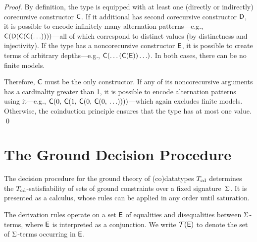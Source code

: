 \begin{report}
\begin{proof}
By definition, the type is equipped with at least one (directly or indirectly)
corecursive constructor $\textsf{C}$. If it additional has second
corecursive constructor $\textsf{D}$, it is possible to encode infinitely many
alternation patterns---e.g.,
$\textsf{C}(\textsf{D}(\textsf{C}(\textsf{C}(\ldots))))$---all of which correspond
to distinct values (by distinctness and injectivity). If the type has a
noncorecursive constructor $\textsf{E}$, it is possible to create terms of
arbitrary depths---e.g., $\textsf{C}(\ldots(\textsf{C}(\textsf{E}))\ldots)$. In
both cases, there can be no finite models.

Therefore, $\textsf{C}$ must be the only constructor.
If any of its noncorecursive arguments has a cardinality greater than 1,
it is possible to encode alternation patterns using it---e.g.,
$\textsf{C}(0,\: \textsf{C}(1,\: \textsf{C}(0,\: \textsf{C}(0,\: \ldots))))$---which
again excludes finite models. Otherwise, the coinduction principle ensures
that the type has at most one value.
\qed
\end{proof}
\end{report}


\section{The Ground Decision Procedure} %
\label{sec:a-ground-decision-procedure-for-co-datatypes}

The decision procedure for the ground theory of (co)datatypes $T_{\mathrm{cd}}$ determines the
$T_{\mathrm{cd}}$-satisfiability of sets of ground constraints over a fixed
signature~$\mathrm{\Sigma}$. It is presented as a calculus, whose rules can be applied in
any order until saturation.

The derivation rules operate on a set $\mathsf{E}$ of equalities and disequalities
between $\mathrm{\Sigma}$-terms, where $\mathsf{E}$ is interpreted as a conjunction.
We write $\mathcal{T}(\mathsf{E})$ to denote the set of $\mathrm{\Sigma}$-terms occurring in $\mathsf{E}$.

